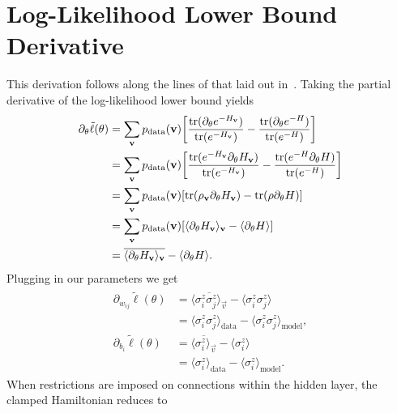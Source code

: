 \section{Log-Likelihood Lower Bound Derivative}\label{app:qbm_log_likelihood_lower_bound_derivative}
This derivation follows along the lines of that laid out in~\cite{amin_2018}.
Taking the partial derivative of the log-likelihood lower bound yields
\begin{align}
\begin{split}
    \label{eq:qbm_log_likelihood_derivative_lower_bound}
    \partial_\theta \tilde{\ell}(\theta)
        &= \sum_{\mathbf{v}} p_{\text{data}}(\mathbf{v}) \bigg[ \frac{\text{tr}(\partial_\theta e^{-H_{\mathbf{v}}})}{\text{tr}(e^{-H_{\mathbf{v}}})} - \frac{\text{tr}(\partial_\theta e^{-H})}{\text{tr}(e^{-H})} \bigg] \\
        &= \sum_{\mathbf{v}} p_{\text{data}}(\mathbf{v}) \bigg[ \frac{\text{tr}(e^{-H_{\mathbf{v}}} \partial_\theta H_{\mathbf{v}})}{\text{tr}(e^{-H_{\mathbf{v}}})} - \frac{\text{tr}(e^{-H} \partial_\theta H)}{\text{tr}(e^{-H})} \bigg] \\
        &= \sum_{\mathbf{v}} p_{\text{data}}(\mathbf{v}) [ \text{tr}(\rho_{\mathbf{v}} \partial_\theta H_{\mathbf{v}}) - \text{tr}(\rho \partial_\theta H) ] \\
        &= \sum_{\mathbf{v}} p_{\text{data}}(\mathbf{v}) [ \langle \partial_\theta H_{\mathbf{v}} \rangle_{\mathbf{v}} - \langle \partial_\theta H \rangle ] \\
        &= \overline{\langle \partial_\theta H_{\mathbf{v}} \rangle_{\mathbf{v}}} - \langle \partial_\theta H \rangle.
\end{split}
\end{align}
Plugging in our parameters we get
\begin{align}
\begin{split}
    \partial_{w_{ij}} \tilde{\ell}(\theta)
        &= \overline{\langle \sigma_i^z \sigma_j^z \rangle_\vec{v}} - \langle \sigma_i^z \sigma_j^z \rangle \\
        &= \langle \sigma_i^z \sigma_j^z \rangle_\text{data} - \langle \sigma_i^z \sigma_j^z \rangle_\text{model}, \\
    \partial_{b_i} \tilde{\ell}(\theta)
        &= \overline{\langle \sigma_i^z \rangle_\vec{v}} - \langle \sigma_i^z \rangle \\
        &= \langle \sigma_i^z \rangle_\text{data} - \langle \sigma_i^z \rangle_\text{model}.
\end{split}
\end{align}
When restrictions are imposed on connections within the hidden layer, the clamped Hamiltonian reduces to
